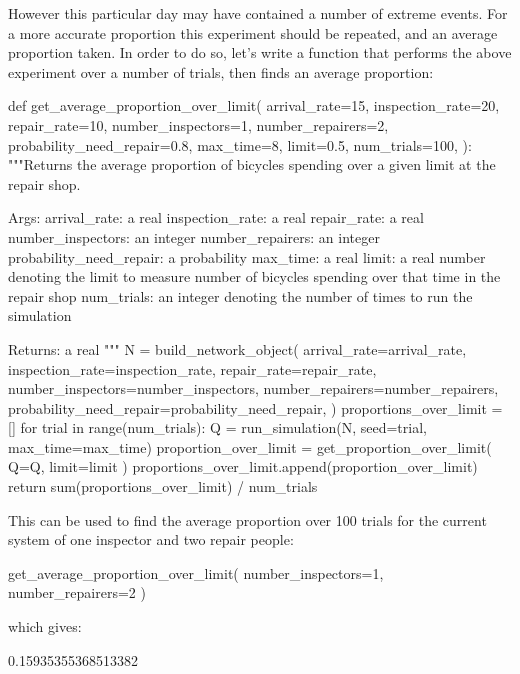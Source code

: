 However this particular day may have contained a number of extreme events.
For a more accurate proportion this experiment should be repeated, and an
average proportion taken.
In order to do so, let's write a function that performs the above experiment
over a number of trials, then finds an average proportion:

\begin{pyin}
def get_average_proportion_over_limit(
    arrival_rate=15,
    inspection_rate=20,
    repair_rate=10,
    number_inspectors=1,
    number_repairers=2,
    probability_need_repair=0.8,
    max_time=8,
    limit=0.5,
    num_trials=100,
):
    """Returns the average proportion of bicycles spending over
    a given limit at the repair shop.
    
    Args:
        arrival_rate: a real
        inspection_rate: a real
        repair_rate: a real
        number_inspectors: an integer
        number_repairers: an integer
        probability_need_repair: a probability
        max_time: a real
        limit: a real number denoting the limit to measure
               number of bicycles spending over that time in
               the repair shop
        num_trials: an integer denoting the number of times to
                    run the simulation
    
    Returns:
        a real
    """
    N = build_network_object(
        arrival_rate=arrival_rate,
        inspection_rate=inspection_rate,
        repair_rate=repair_rate,
        number_inspectors=number_inspectors,
        number_repairers=number_repairers,
        probability_need_repair=probability_need_repair,
    )
    proportions_over_limit = []
    for trial in range(num_trials):
        Q = run_simulation(N, seed=trial, max_time=max_time)
        proportion_over_limit = get_proportion_over_limit(
            Q=Q, limit=limit
        )
        proportions_over_limit.append(proportion_over_limit)
    return sum(proportions_over_limit) / num_trials
\end{pyin}

This can be used to find the average proportion over 100 trials for the current
system of one inspector and two repair people:

\begin{pyin}
get_average_proportion_over_limit(
    number_inspectors=1, number_repairers=2
)
\end{pyin}

which gives:

\begin{pyout}
0.15935355368513382
\end{pyout}

